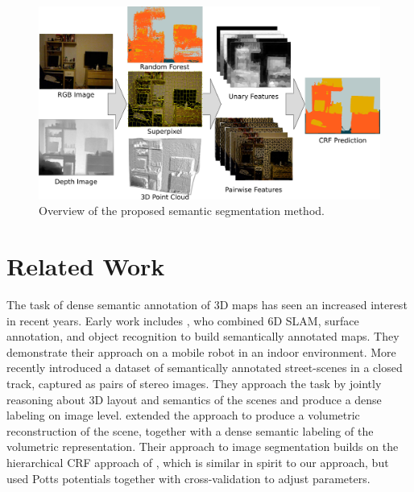 \begin{figure}
    \begin{center}
        \includegraphics[width=\linewidth]{nyu/images/teaser}
    \end{center}
    \caption{%
        Overview of the proposed semantic segmentation method.
    }
\end{figure}


\section{Related Work}
The task of dense semantic annotation of 3D maps has seen an increased interest
in recent years.  Early work includes \citet{nuchter2008towards}, who combined
6D SLAM, surface annotation, and object recognition to build semantically
annotated maps. They demonstrate their approach on a mobile robot in an indoor
environment.
%
More recently \citet{sengupta2012automatic} introduced a dataset of
semantically annotated street-scenes in a closed track, captured as pairs of
stereo images. They approach the task by jointly reasoning about 3D layout and
semantics of the scenes and produce a dense labeling on image level.
\citet{senguptaurban} extended the approach to produce a volumetric
reconstruction of the scene, together with a dense semantic labeling of the
volumetric representation. Their approach to image segmentation builds on
the hierarchical CRF approach of
\citet{ladicky2009associative}, which is similar in spirit to our approach,
but used Potts potentials together with cross-validation to adjust parameters.

